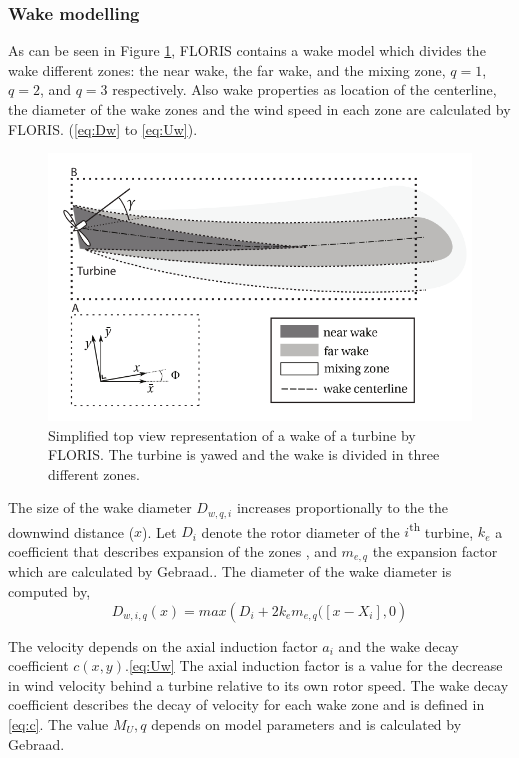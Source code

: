 \subsubsection{Wake modelling}
As can be seen in Figure \ref{fig:wake}, FLORIS  contains a wake model which divides the wake different zones: the near wake, the far wake, and  the mixing zone, $q = 1$, $q = 2$, and $q = 3$ respectively. Also  wake properties as location of the centerline, the diameter of the wake zones and the wind speed in each zone are calculated by FLORIS.        (\ref{eq:Dw} to \ref{eq:Uw}).\newline 
\begin{figure}
  	\includegraphics[width=\linewidth]{./Figures/WakeFLORIS.png}
  	\caption{Simplified top view representation of a wake of a turbine by FLORIS.\cite{Gebraad2016} The turbine is yawed and the wake is divided in three different zones.  }
	\label{fig:wake}
\end{figure}
The size of the wake diameter $D_{w,q,i}$ increases proportionally to the the downwind distance ($x$). Let $D_i$ denote the rotor diameter of the $i${\textsuperscript{th}} turbine, $k_e$ a coefficient that describes expansion of the zones , and $m_{e,q}$ the expansion factor which are calculated by Gebraad.\cite{Gebraad2016}. The diameter of the wake diameter is computed by,
\begin{equation}
\label{eq:Dw}
D_{w,i,q}(x) = max\left({D_i + 2k_em_{e,q}([x - X_i],0} \right)
\end{equation}

The velocity depends on the axial induction factor $a_i$ and the wake decay coefficient $c(x,y)$.\ref{eq:Uw} The axial induction factor is a value for the decrease in wind velocity behind a turbine relative to its own rotor speed. The wake decay coefficient describes the decay of velocity for each wake zone and is defined in \ref{eq:c}. The value $M_U,q$ depends on model parameters and is calculated by Gebraad.\cite{Gebraad2016}   

